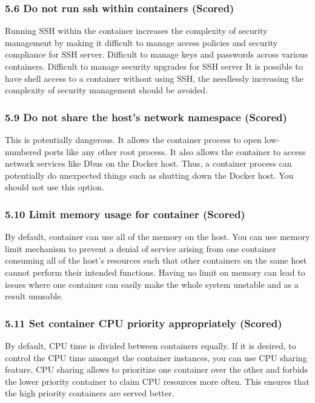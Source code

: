 \subsubsection*{5.6 Do not run ssh within containers (Scored)}Running SSH within the container increases the complexity of security management by
making it
difficult to manage access policies and security compliance for SSH server. Difficult to manage keys and passwords across various containers. Difficult to manage security upgrades for SSH server
It is possible to have shell access to a container without using SSH, the needlessly
increasing the complexity of security management should be avoided.


\subsubsection*{5.9 Do not share the host's network namespace (Scored)} This is potentially dangerous. It allows the container process to open low-numbered ports
like any other root process. It also allows the container to access network services like Dbus on the Docker host. Thus, a container process can potentially do unexpected things
such as shutting down the Docker host. You should not use this option.

\subsubsection*{5.10 Limit memory usage for container (Scored)}
By default, container can use all of the memory on the host. You can use memory limit
mechanism to prevent a denial of service arising from one container consuming all of the
host’s resources such that other containers on the same host cannot perform their intended
functions. Having no limit on memory can lead to issues where one container can easily
make the whole system unstable and as a result unusable.

\subsubsection*{5.11 Set container CPU priority appropriately (Scored)}
By default, CPU time is divided between containers equally. If it is desired, to control the
CPU time amongst the container instances, you can use CPU sharing feature. CPU sharing
allows to prioritize one container over the other and forbids the lower priority container to
claim CPU resources more often. This ensures that the high priority containers are served
better.

